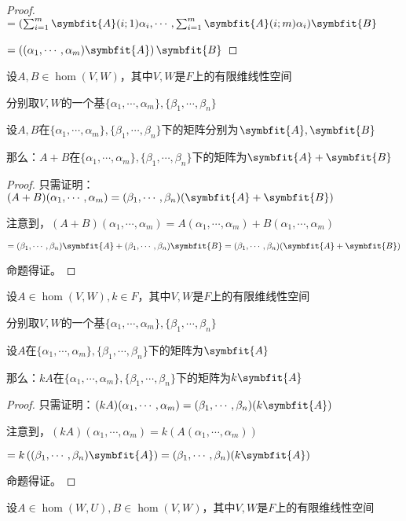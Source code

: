 \documentclass[12pt, a4paper, oneside, UTF8]{ctexbook}
\begin{document}
\begin{para}{0}
\begin{proof}
						$=(\sum_{i=1}^m\symbfit{A}(i;1)\alpha_i  , \cdots ,\sum_{i=1}^m\symbfit{A}(i;m)\alpha_i)\symbfit{B}$

						$=\left((\alpha_1,\cdots,\alpha_m)\symbfit{A}\right)\symbfit{B}$
					\end{proof}
				\point{}
					\begin{proposition}
						设$A,B \in \hom(V,W)$，其中$V,W$是$F$上的有限维线性空间

						分别取$V,W$的一个基$\{\alpha_1,\cdots,\alpha_m\},\{\beta_1,\cdots,\beta_n\}$

						设$A,B$在$\{\alpha_1,\cdots,\alpha_m\},\{\beta_1,\cdots,\beta_n\}$下的矩阵分别为$\symbfit{A},\symbfit{B}$

						那么：$A+B$在$\{\alpha_1,\cdots,\alpha_m\},\{\beta_1,\cdots,\beta_n\}$下的矩阵为$\symbfit{A}+\symbfit{B}$
					\end{proposition}
					\begin{proof}
						只需证明：$(A+B)(\alpha_1,\cdots,\alpha_m)=(\beta_1,\cdots,\beta_n)(\symbfit{A}+\symbfit{B})$
					
						注意到，$(A+B)(\alpha_1,\cdots,\alpha_m)=A(\alpha_1,\cdots,\alpha_m)+B(\alpha_1,\cdots,\alpha_m)$

						$=(\beta_1,\cdots,\beta_n)\symbfit{A}+(\beta_1,\cdots,\beta_n)\symbfit{B}=(\beta_1,\cdots,\beta_n)(\symbfit{A}+\symbfit{B})$

						命题得证。
					\end{proof}
				\point{}
					\begin{proposition}
						设$A \in \hom(V,W),k \in F$，其中$V,W$是$F$上的有限维线性空间

						分别取$V,W$的一个基$\{\alpha_1,\cdots,\alpha_m\},\{\beta_1,\cdots,\beta_n\}$

						设$A$在$\{\alpha_1,\cdots,\alpha_m\},\{\beta_1,\cdots,\beta_n\}$下的矩阵为$\symbfit{A}$

						那么：$kA$在$\{\alpha_1,\cdots,\alpha_m\},\{\beta_1,\cdots,\beta_n\}$下的矩阵为$k\symbfit{A}$
					\end{proposition}
					\begin{proof}
						只需证明：$(kA)(\alpha_1,\cdots,\alpha_m)=(\beta_1,\cdots,\beta_n)(k\symbfit{A})$
					
						注意到，$(kA)(\alpha_1,\cdots,\alpha_m)=k\left(A(\alpha_1,\cdots,\alpha_m)\right)$

						$=k\left((\beta_1,\cdots,\beta_n)\symbfit{A}\right)=(\beta_1,\cdots,\beta_n)(k\symbfit{A})$

						命题得证。
					\end{proof}
				\point{}
					\begin{proposition}
						设$A\in \hom(W,U),B \in \hom(V,W)$，其中$V,W$是$F$上的有限维线性空间


\end{proposition}
\end{para}
\end{document}
